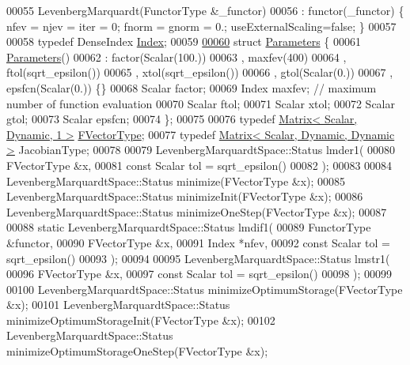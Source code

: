 \begin{DoxyCode}
00055     LevenbergMarquardt(FunctorType &\_functor)
00056         : functor(\_functor) \{ nfev = njev = iter = 0;  fnorm = gnorm = 0.; useExternalScaling=\textcolor{keyword}{false}; \}
00057 
00058     \textcolor{keyword}{typedef} DenseIndex \hyperlink{namespace_eigen_a62e77e0933482dafde8fe197d9a2cfde}{Index};
00059     
\hyperlink{struct_eigen_1_1_levenberg_marquardt_1_1_parameters}{00060}     \textcolor{keyword}{struct }\hyperlink{struct_eigen_1_1_levenberg_marquardt_1_1_parameters}{Parameters} \{
00061         \hyperlink{struct_eigen_1_1_levenberg_marquardt_1_1_parameters}{Parameters}()
00062             : factor(Scalar(100.))
00063             , maxfev(400)
00064             , ftol(sqrt\_epsilon())
00065             , xtol(sqrt\_epsilon())
00066             , gtol(Scalar(0.))
00067             , epsfcn(Scalar(0.)) \{\}
00068         Scalar factor;
00069         Index maxfev;   \textcolor{comment}{// maximum number of function evaluation}
00070         Scalar ftol;
00071         Scalar xtol;
00072         Scalar gtol;
00073         Scalar epsfcn;
00074     \};
00075 
00076     \textcolor{keyword}{typedef} \hyperlink{group___core___module}{Matrix< Scalar, Dynamic, 1 >} \hyperlink{group___core___module}{FVectorType};
00077     \textcolor{keyword}{typedef} \hyperlink{group___core___module}{Matrix< Scalar, Dynamic, Dynamic >} JacobianType;
00078 
00079     LevenbergMarquardtSpace::Status lmder1(
00080             FVectorType &x,
00081             \textcolor{keyword}{const} Scalar tol = sqrt\_epsilon()
00082             );
00083 
00084     LevenbergMarquardtSpace::Status minimize(FVectorType &x);
00085     LevenbergMarquardtSpace::Status minimizeInit(FVectorType &x);
00086     LevenbergMarquardtSpace::Status minimizeOneStep(FVectorType &x);
00087 
00088     \textcolor{keyword}{static} LevenbergMarquardtSpace::Status lmdif1(
00089             FunctorType &functor,
00090             FVectorType &x,
00091             Index *nfev,
00092             \textcolor{keyword}{const} Scalar tol = sqrt\_epsilon()
00093             );
00094 
00095     LevenbergMarquardtSpace::Status lmstr1(
00096             FVectorType  &x,
00097             \textcolor{keyword}{const} Scalar tol = sqrt\_epsilon()
00098             );
00099 
00100     LevenbergMarquardtSpace::Status minimizeOptimumStorage(FVectorType  &x);
00101     LevenbergMarquardtSpace::Status minimizeOptimumStorageInit(FVectorType  &x);
00102     LevenbergMarquardtSpace::Status minimizeOptimumStorageOneStep(FVectorType  &x);

\end{DoxyCode}
